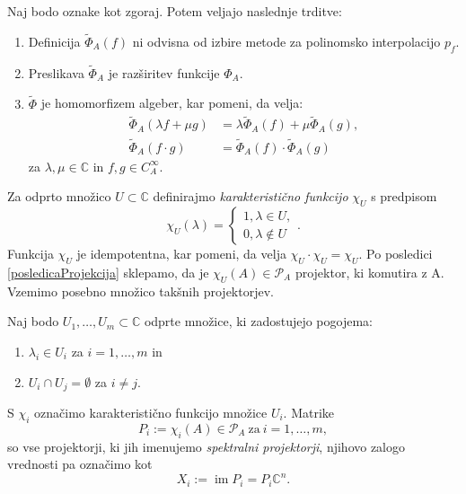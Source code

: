 \documentclass[mat1]{fmfdelo}
\newcommand{\C}{\mathbb C}
\DeclareMathOperator{\Ima}{im}
\begin{document}
\begin{trditev} \label{trditevPhiAlgebra}
    Naj bodo oznake kot zgoraj. Potem veljajo naslednje trditve:
    \begin{enumerate}
        \item Definicija $\widetilde{\Phi}_A(f)$ ni odvisna od izbire metode za polinomsko interpolacijo $p_f$.
        \item Preslikava $\widetilde{\Phi}_A$ je razširitev funkcije $\Phi_A$.
        \item $\widetilde{\Phi}$ je homomorfizem algeber, kar pomeni, da velja:
        \begin{align*}
            \widetilde{\Phi}_A(\lambda f + \mu g) &= \lambda \widetilde{\Phi}_A(f) + \mu \widetilde{\Phi}_A(g), \\
            \widetilde{\Phi}_A(f \cdot g) &= \widetilde{\Phi}_A(f) \cdot \widetilde{\Phi}_A(g)
        \end{align*}
        za $\lambda, \mu \in \C$ in $f, g \in C_A^\infty$.
    \end{enumerate}
\end{trditev}
Za odprto množico $U \subset \C$ definirajmo \emph{karakteristično funkcijo} $\chi_U$ s predpisom
\begin{equation*}
    \chi_U(\lambda) =
    \begin{cases}
        1, \lambda \in U, \\
        0, \lambda \notin U
    \end{cases}.
\end{equation*}
Funkcija $\chi_U$ je idempotentna, kar pomeni, da velja $\chi_U \cdot \chi_U = \chi_U$. Po posledici \ref{posledicaProjekcija} sklepamo, da je $\chi_U(A) \in \mathcal{P}_A$ projektor, ki komutira z A. Vzemimo posebno množico takšnih projektorjev.
\begin{definicija}\label{Uimnozice}
Naj bodo $U_1, \ldots, U_m \subset \C$ odprte množice, ki zadostujejo pogojema:
\begin{enumerate}
    \item $\lambda_i \in U_i$ za $i = 1,\ldots,m$ in
    \item $U_i \cap U_j = \emptyset$ za $i \neq j$.
\end{enumerate}
S $\chi_i$ označimo karakteristično funkcijo množice $U_i$. Matrike
\begin{equation} \label{definicijaProjekcije}
    P_i := \chi_i(A) \in \mathcal{P}_A\ \text{za}\ i = 1,\ldots, m,
\end{equation}
so vse projektorji, ki jih imenujemo \emph{spektralni projektorji}, njihovo zalogo vrednosti pa označimo kot 
\begin{equation} \label{zalogeProjekcij}
    X_i := \Ima P_i = P_i \C^n.
\end{equation}
\end{definicija}
\end{document}
